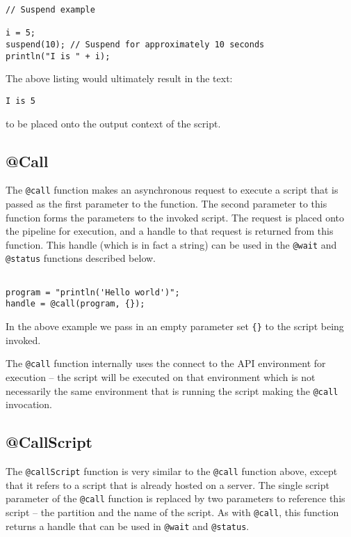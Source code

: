 \begin{lstlisting}[caption={Reflex Page Script Example}]
// Suspend example

i = 5;
suspend(10); // Suspend for approximately 10 seconds
println("I is " + i);

\end{lstlisting}

The above listing would ultimately result in the text:

\begin{Verbatim}
I is 5
\end{Verbatim}

to be placed onto the output context of the script.

\subsection{@Call}

The \verb+@call+ function makes an asynchronous request to execute a script that is passed as the first parameter to the function. The second parameter to this function forms the parameters to the invoked script. The request is placed onto the \Rapture pipeline for execution, and a handle to that request is returned from this function. This handle (which is in fact a string) can be used in the \verb+@wait+ and \verb+@status+ functions described below.

\begin{lstlisting}[caption={Example @Call}]

program = "println('Hello world')";
handle = @call(program, {});

\end{lstlisting}

In the above example we pass in an empty parameter set \verb+{}+ to the script being invoked.

The \verb+@call+ function internally uses the connect to the \Rapture API environment for execution -- the script will be executed on that environment which is not necessarily the same environment that is running the script making the \verb+@call+ invocation.

\subsection{@CallScript}
The \verb+@callScript+ function is very similar to the \verb+@call+ function above, except that it refers to a script that is already hosted on a \Rapture server. The single script parameter of the \verb+@call+ function is replaced by two parameters to reference this script -- the partition and the name of the script. As with \verb+@call+, this function returns a handle that can be used in \verb+@wait+ and \verb+@status+.

